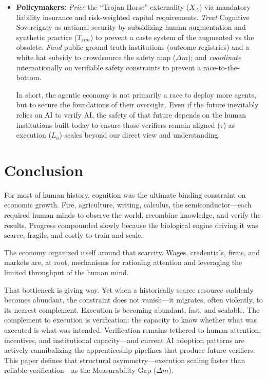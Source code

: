 \documentclass[12pt, letter]{article}
\begin{document}
\begin{itemize}
\item \textbf{Policymakers:} \emph{Price} the ``Trojan Horse'' externality ($X_A$) via mandatory liability insurance and risk-weighted capital requirements. \emph{Treat} Cognitive Sovereignty as national security by subsidizing human augmentation and synthetic practice ($T_{sim}$) to prevent a caste system of the augmented vs the obsolete. \emph{Fund} public ground truth institutions (outcome registries) and a white hat subsidy to crowdsource the safety map ($\Delta m$); and \emph{coordinate} internationally on verifiable safety constraints to prevent a race-to-the-bottom.

In short, the agentic economy is not primarily a race to deploy more agents, but to secure the foundations of their oversight. Even if the future inevitably relies on AI to verify AI, the safety of that future depends on the human institutions built today to ensure those verifiers remain aligned ($\tau$) as execution ($L_a$) scales beyond our direct view and understanding.
\end{itemize}
\clearpage



\normalsize

\section{Conclusion}\label{sec:conclusion}

For most of human history, cognition was the ultimate binding constraint on economic growth. Fire, agriculture, writing, calculus, the semiconductor---each required human minds to observe the world, recombine knowledge, and verify the results. Progress compounded slowly because the biological engine driving it was scarce, fragile, and costly to train and scale. 

The economy organized itself around that scarcity. Wages, credentials, firms, and markets are, at root, mechanisms for rationing attention and leveraging the limited throughput of the human mind.

That bottleneck is giving way. Yet when a historically scarce resource suddenly becomes abundant, the constraint does not vanish---it migrates, often violently, to its nearest complement. Execution is becoming abundant, fast, and scalable. The complement to execution is verification: the capacity to know whether what was executed is what was intended. Verification remains tethered to human attention, incentives, and institutional capacity---and current AI adoption patterns are actively cannibalizing the apprenticeship pipelines that produce future verifiers. This paper defines that structural asymmetry---execution scaling faster than reliable verification---as the Measurability Gap ($\Delta m$).
\end{document}
